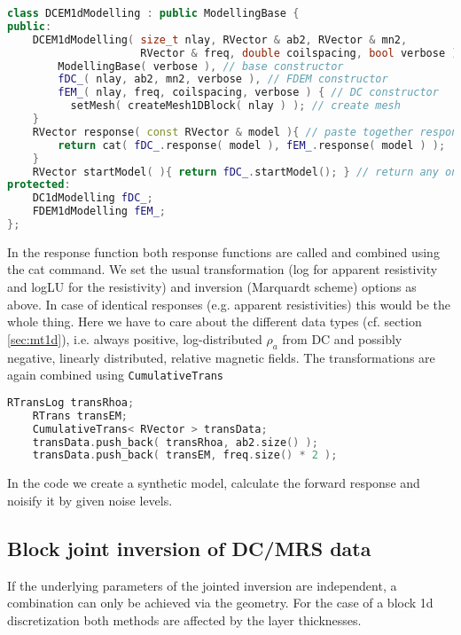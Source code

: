 \begin{lstlisting}[language=C++,morekeywords={RVector,RMatrix}]
class DCEM1dModelling : public ModellingBase {
public:
    DCEM1dModelling( size_t nlay, RVector & ab2, RVector & mn2, 
                     RVector & freq, double coilspacing, bool verbose ) : 
    	ModellingBase( verbose ), // base constructor
    	fDC_( nlay, ab2, mn2, verbose ), // FDEM constructor
    	fEM_( nlay, freq, coilspacing, verbose ) { // DC constructor 
          setMesh( createMesh1DBlock( nlay ) ); // create mesh
    }
    RVector response( const RVector & model ){ // paste together responses
        return cat( fDC_.response( model ), fEM_.response( model ) ); 
    }
    RVector startModel( ){ return fDC_.startModel(); } // return any one
protected:
    DC1dModelling fDC_;
    FDEM1dModelling fEM_;
};
\end{lstlisting}

In the response function both response functions are called and combined using the cat command.
We set the usual transformation (log for apparent resistivity and logLU for the resistivity) and inversion (Marquardt scheme) options as above.
In case of identical responses (e.g. apparent resistivities) this would be the whole thing.
Here we have to care about the different data types (cf. section \ref{sec:mt1d}), i.e. always positive, log-distributed $\rho_a$ from DC and possibly negative, linearly distributed, relative magnetic fields.
The transformations are again combined using \lstinline|CumulativeTrans|
\begin{lstlisting}[language=C++,morekeywords={RVector,RMatrix}]
    RTransLog transRhoa;
    RTrans transEM;
    CumulativeTrans< RVector > transData;
    transData.push_back( transRhoa, ab2.size() );
    transData.push_back( transEM, freq.size() * 2 );
\end{lstlisting}

In the code we create a synthetic model, calculate the forward response and noisify it by given noise levels.


\subsection{Block joint inversion of DC/MRS data}\label{sec:blockjoint}
If the underlying parameters of the jointed inversion are independent, a combination can only be achieved via the geometry.
For the case of a block 1d discretization both methods are affected by the layer thicknesses.


